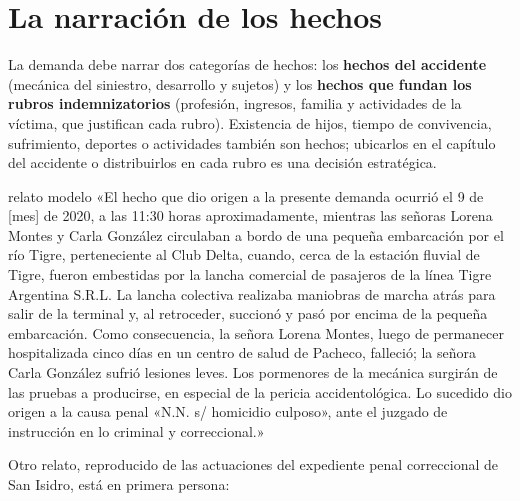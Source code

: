 \documentclass[12pt,oneside]{book}
\begin{document}
\section{La narración de los hechos}

La demanda debe narrar dos categorías de hechos: los \textbf{hechos del accidente} (mecánica del siniestro, desarrollo y sujetos) y los \textbf{hechos que fundan los rubros indemnizatorios} (profesión, ingresos, familia y actividades de la víctima, que justifican cada rubro). Existencia de hijos, tiempo de convivencia, sufrimiento, deportes o actividades también son hechos; ubicarlos en el capítulo del accidente o distribuirlos en cada rubro es una decisión estratégica.

\begin{ejemplo}{relato modelo}
«El hecho que dio origen a la presente demanda ocurrió el 9 de [mes] de 2020, a las 11:30 horas aproximadamente, mientras las señoras Lorena Montes y Carla González circulaban a bordo de una pequeña embarcación por el río Tigre, perteneciente al Club Delta, cuando, cerca de la estación fluvial de Tigre, fueron embestidas por la lancha comercial de pasajeros de la línea Tigre Argentina S.R.L. La lancha colectiva realizaba maniobras de marcha atrás para salir de la terminal y, al retroceder, succionó y pasó por encima de la pequeña embarcación. Como consecuencia, la señora Lorena Montes, luego de permanecer hospitalizada cinco días en un centro de salud de Pacheco, falleció; la señora Carla González sufrió lesiones leves. Los pormenores de la mecánica surgirán de las pruebas a producirse, en especial de la pericia accidentológica. Lo sucedido dio origen a la causa penal «N.N. s/ homicidio culposo», ante el juzgado de instrucción en lo criminal y correccional.»
\end{ejemplo}

Otro relato, reproducido de las actuaciones del expediente penal correccional de San Isidro, está en primera persona:
\end{document}
